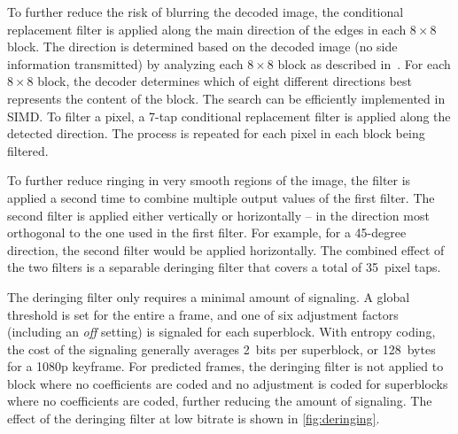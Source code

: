 \documentclass[english,conference,10pt]{IEEEtran}
\begin{document}
To further reduce the risk of blurring the decoded image, the conditional
replacement filter is applied along the main direction of the edges
in each $8\times 8$ block. The direction is determined based on the decoded image
(no side information transmitted) by analyzing each $8\times 8$ block as described
in~\cite{ValinDeringing}. For each $8\times 8$ block, the decoder determines which
of eight different directions best represents the content of the block.
The search can be efficiently implemented in SIMD. To filter a pixel, a 7-tap
conditional replacement filter is applied along the detected direction.
The process is repeated for each pixel in each block being filtered.

To further reduce ringing in very smooth regions of the image, the filter
is applied a second time to combine multiple output values of the
first filter. The second filter is applied either vertically or horizontally
-- in the direction most orthogonal to the one used in the first filter.
For example, for a 45-degree direction, the second filter would be
applied horizontally. The combined effect of the two filters is a separable
deringing filter that covers a total of 35~pixel taps.

The deringing filter only requires a minimal amount of signaling. A global threshold
is set for the entire a frame, and one of six adjustment factors (including an
\textit{off} setting) is signaled for each superblock. With entropy coding, the
cost of the signaling generally averages 2~bits per superblock, or 128~bytes for
a 1080p keyframe. For predicted frames, the deringing filter is not applied to
block where no coefficients are coded and no adjustment is coded for superblocks
where no coefficients are coded, further reducing the amount of signaling. The
effect of the deringing filter at low bitrate is shown in \cref{fig:deringing}.
\end{document}
